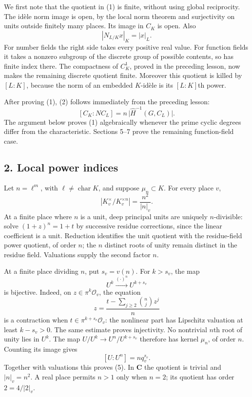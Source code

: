 \documentclass[11pt,a4paper]{article}
\begin{document}
We first note that the quotient in (1) is finite, without using global
reciprocity. The idèle norm image is open, by the local norm theorem and
surjectivity on units outside finitely many places. Its image in \(C_K\)
is open. Also \[
|N_{L/K}x|_K=|x|_L.
\tag{3}
\] For number fields the right side takes every positive real value. For
function fields it takes a nonzero subgroup of the discrete group of
possible contents, so has finite index there. The compactness of
\(C_K^1\), proved in the preceding lesson, now makes the remaining
discrete quotient finite. Moreover this quotient is killed by \([L:K]\),
because the norm of an embedded \(K\)-idèle is its \([L:K]\)th power.

After proving (1), (2) follows immediately from the preceding lesson: \[
[C_K:NC_L]
=n\,\bigl|\widehat H^{-1}(G,C_L)\bigr|.
\tag{4}
\] The argument below proves (1) algebraically whenever the prime cyclic
degrees differ from the characteristic. Sections 5--7 prove the
remaining function-field case.

\subsection{2. Local power indices}\label{local-power-indices}

Let \(n=\ell^m\), with \(\ell\ne\operatorname{char}K\), and suppose
\(\mu_n\subset K\). For every place \(v\), \[
|K_v^\times/K_v^{\times n}|=\frac{n^2}{|n|_v}.
\tag{5}
\] At a finite place where \(n\) is a unit, deep principal units are
uniquely \(n\)-divisible: solve \((1+z)^n=1+t\) by successive residue
corrections, since the linear coefficient is a unit. Reduction
identifies the unit quotient with the residue-field power quotient, of
order \(n\); the \(n\) distinct roots of unity remain distinct in the
residue field. Valuations supply the second factor \(n\).

At a finite place dividing \(n\), put \(s_v=v(n)\). For \(k>s_v\), the
map \[
U^k\xrightarrow{(\cdot)^n}U^{k+s_v}
\tag{6}
\] is bijective. Indeed, on \(z\in\pi^k\mathcal O_v\), the equation \[
z=\frac{t-\sum_{j\geq2}\binom nj z^j}{n}
\] is a contraction when \(t\in\pi^{k+s_v}\mathcal O_v\): the nonlinear
part has Lipschitz valuation at least \(k-s_v>0\). The same estimate
proves injectivity. No nontrivial \(n\)th root of unity lies in \(U^k\).
The map \(U/U^k\to U^n/U^{k+s_v}\) therefore has kernel \(\mu_n\), of
order \(n\). Counting its image gives \[
[U:U^n]=nq_v^{s_v}.
\] Together with valuations this proves (5). In \(\mathbf C\) the
quotient is trivial and \(|n|_v=n^2\). A real place permits \(n>1\) only
when \(n=2\); its quotient has order \(2=4/|2|_v\).
\end{document}
